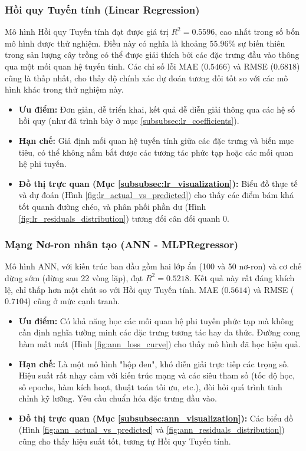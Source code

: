 \subsubsection{Hồi quy Tuyến tính (Linear Regression)}
Mô hình Hồi quy Tuyến tính đạt được giá trị $R^2 = 0.5596$, cao nhất trong số bốn mô hình được thử nghiệm. Điều này có nghĩa là khoảng $55.96\%$ sự biến thiên trong sản lượng cây trồng có thể được giải thích bởi các đặc trưng đầu vào thông qua một mối quan hệ tuyến tính. Các chỉ số lỗi MAE ($0.5466$) và RMSE ($0.6818$) cũng là thấp nhất, cho thấy độ chính xác dự đoán tương đối tốt so với các mô hình khác trong thử nghiệm này.
\begin{itemize}
    \item \textbf{Ưu điểm:} Đơn giản, dễ triển khai, kết quả dễ diễn giải thông qua các hệ số hồi quy (như đã trình bày ở mục \ref{subsubsec:lr_coefficients}).
    \item \textbf{Hạn chế:} Giả định mối quan hệ tuyến tính giữa các đặc trưng và biến mục tiêu, có thể không nắm bắt được các tương tác phức tạp hoặc các mối quan hệ phi tuyến.
    \item \textbf{Đồ thị trực quan (Mục \ref{subsubsec:lr_visualization}):} Biểu đồ thực tế và dự đoán (Hình \ref{fig:lr_actual_vs_predicted}) cho thấy các điểm bám khá tốt quanh đường chéo, và phân phối phần dư (Hình \ref{fig:lr_residuals_distribution}) tương đối cân đối quanh 0.
\end{itemize}

\subsubsection{Mạng Nơ-ron nhân tạo (ANN - MLPRegressor)}
Mô hình ANN, với kiến trúc ban đầu gồm hai lớp ẩn (100 và 50 nơ-ron) và cơ chế dừng sớm (dừng sau 22 vòng lặp), đạt $R^2 = 0.5218$. Kết quả này rất đáng khích lệ, chỉ thấp hơn một chút so với Hồi quy Tuyến tính. MAE ($0.5614$) và RMSE ($0.7104$) cũng ở mức cạnh tranh.
\begin{itemize}
    \item \textbf{Ưu điểm:} Có khả năng học các mối quan hệ phi tuyến phức tạp mà không cần định nghĩa tường minh các đặc trưng tương tác hay đa thức. Đường cong hàm mất mát (Hình \ref{fig:ann_loss_curve}) cho thấy mô hình đã học hiệu quả.
    \item \textbf{Hạn chế:} Là một mô hình "hộp đen", khó diễn giải trực tiếp các trọng số. Hiệu suất rất nhạy cảm với kiến trúc mạng và các siêu tham số (tốc độ học, số epochs, hàm kích hoạt, thuật toán tối ưu, etc.), đòi hỏi quá trình tinh chỉnh kỹ lưỡng. Yêu cầu chuẩn hóa đặc trưng đầu vào.
    \item \textbf{Đồ thị trực quan (Mục \ref{subsubsec:ann_visualization}):} Các biểu đồ (Hình \ref{fig:ann_actual_vs_predicted} và \ref{fig:ann_residuals_distribution}) cũng cho thấy hiệu suất tốt, tương tự Hồi quy Tuyến tính.
\end{itemize}

